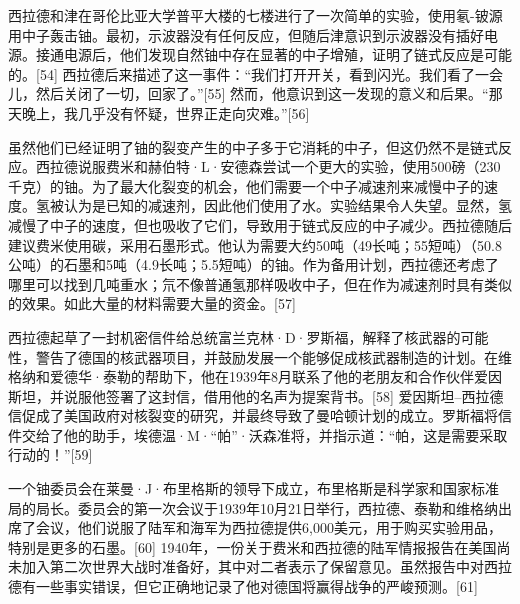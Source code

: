 西拉德和津在哥伦比亚大学普平大楼的七楼进行了一次简单的实验，使用氡-铍源用中子轰击铀。最初，示波器没有任何反应，但随后津意识到示波器没有插好电源。接通电源后，他们发现自然铀中存在显著的中子增殖，证明了链式反应是可能的。[54] 西拉德后来描述了这一事件：“我们打开开关，看到闪光。我们看了一会儿，然后关闭了一切，回家了。”[55] 然而，他意识到这一发现的意义和后果。“那天晚上，我几乎没有怀疑，世界正走向灾难。”[56]

虽然他们已经证明了铀的裂变产生的中子多于它消耗的中子，但这仍然不是链式反应。西拉德说服费米和赫伯特·L·安德森尝试一个更大的实验，使用500磅（230千克）的铀。为了最大化裂变的机会，他们需要一个中子减速剂来减慢中子的速度。氢被认为是已知的减速剂，因此他们使用了水。实验结果令人失望。显然，氢减慢了中子的速度，但也吸收了它们，导致用于链式反应的中子减少。西拉德随后建议费米使用碳，采用石墨形式。他认为需要大约50吨（49长吨；55短吨）（50.8公吨）的石墨和5吨（4.9长吨；5.5短吨）的铀。作为备用计划，西拉德还考虑了哪里可以找到几吨重水；氘不像普通氢那样吸收中子，但在作为减速剂时具有类似的效果。如此大量的材料需要大量的资金。[57]

西拉德起草了一封机密信件给总统富兰克林·D·罗斯福，解释了核武器的可能性，警告了德国的核武器项目，并鼓励发展一个能够促成核武器制造的计划。在维格纳和爱德华·泰勒的帮助下，他在1939年8月联系了他的老朋友和合作伙伴爱因斯坦，并说服他签署了这封信，借用他的名声为提案背书。[58] 爱因斯坦–西拉德信促成了美国政府对核裂变的研究，并最终导致了曼哈顿计划的成立。罗斯福将信件交给了他的助手，埃德温·M·“帕”·沃森准将，并指示道：“帕，这是需要采取行动的！”[59]

一个铀委员会在莱曼·J·布里格斯的领导下成立，布里格斯是科学家和国家标准局的局长。委员会的第一次会议于1939年10月21日举行，西拉德、泰勒和维格纳出席了会议，他们说服了陆军和海军为西拉德提供6,000美元，用于购买实验用品，特别是更多的石墨。[60] 1940年，一份关于费米和西拉德的陆军情报报告在美国尚未加入第二次世界大战时准备好，其中对二者表示了保留意见。虽然报告中对西拉德有一些事实错误，但它正确地记录了他对德国将赢得战争的严峻预测。[61]
